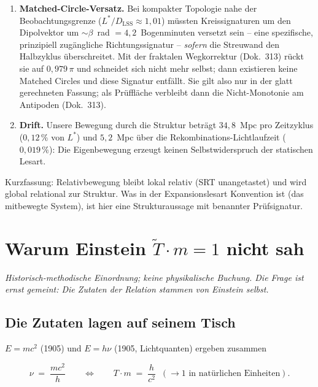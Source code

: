 \begin{enumerate}
  \item \textbf{Matched-Circle-Versatz.} Bei kompakter Topologie
        nahe der Beobachtungsgrenze ($L^{*}/D_\text{LSS} \approx
        1{,}01$) müssten Kreissignaturen um den Dipolvektor um
        $\sim\beta$~rad $= 4{,}2$~Bogenminuten versetzt sein --
        eine spezifische, prinzipiell zugängliche
        Richtungssignatur -- \emph{sofern} die Streuwand den
        Halbzyklus überschreitet. Mit der fraktalen Wegkorrektur
        (Dok.~313) rückt sie auf $0{,}979\,\pi$ und schneidet
        sich nicht mehr selbst; dann existieren keine Matched
        Circles und diese Signatur entfällt. Sie gilt also nur in
        der glatt gerechneten Fassung; als Prüffläche verbleibt
        dann die Nicht-Monotonie am Antipoden (Dok.~313).
  \item \textbf{Drift.} Unsere Bewegung durch die Struktur beträgt
        $34{,}8$~Mpc pro Zeitzyklus ($0{,}12\,\%$ von $L^{*}$) und
        $5{,}2$~Mpc über die Rekombinations-Lichtlaufzeit
        ($0{,}019\,\%$): Die Eigenbewegung erzeugt keinen
        Selbstwiderspruch der statischen Lesart.
\end{enumerate}

Kurzfassung: Relativbewegung bleibt lokal relativ (SRT
unangetastet) und wird global relational zur Struktur. Was in der
Expansionslesart Konvention ist (das mitbewegte System), ist hier
eine Strukturaussage mit benannter Prüfsignatur.

\chapter{Warum Einstein $\tilde T \cdot m = 1$ nicht sah}

\emph{Historisch-methodische Einordnung; keine physikalische
Buchung. Die Frage ist ernst gemeint: Die Zutaten der Relation
stammen von Einstein selbst.}

\section{Die Zutaten lagen auf seinem Tisch}

$E = mc^2$ (1905) und $E = h\nu$ (1905, Lichtquanten) ergeben
zusammen

\begin{equation}
  \nu \;=\; \frac{mc^2}{h}
  \qquad\Longleftrightarrow\qquad
  T \cdot m \;=\; \frac{h}{c^2} \;\;(\to 1
  \text{ in natürlichen Einheiten}).
\end{equation}

